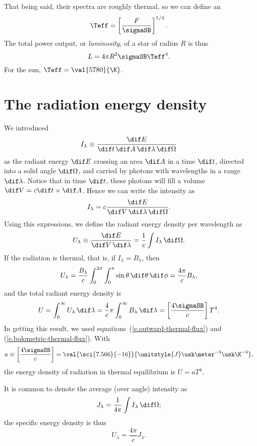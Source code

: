  That being said, their spectra are roughly thermal, so we can define an 
\[	\Teff = \left[\frac{F}{\sigmaSB}\right]^{1/4}. \]
The total power output, or \emph{luminosity}, of a star of radius $R$ is thus
\begin{equation}\label{e.total-luminosity}
	L = 4\pi R^{2}\sigmaSB \Teff^{4}.
\end{equation}
For the sun, $\Teff = \val{5780}{\K}$.

\section{The radiation energy density}\label{s.radiation-energy-density}

We introduced
\[
I_{\lambda} \equiv \frac{\dif E}{\dif t\,\dif A\,\dif\lambda\,\dif\Omega}
\]
as the radiant energy $\dif E$ crossing an area $\dif A$ in a time $\dif t$, directed into a solid angle $\dif\Omega$, and carried by photons with wavelengths in a range $\dif\lambda$. Notice that in time $\dif t$, these photons will fill a volume $\dif V = c\dif t\times \dif A$. Hence we can write the intensity as
\[
I_{\lambda} = c\frac{\dif E}{\dif V\,\dif \lambda\,\dif\Omega}.
\]
Using this expressions, we define the radiant energy density per wavelength as
\begin{equation}
	U_{\lambda} \equiv \frac{\dif E}{\dif V\,\dif\lambda} = \frac{1}{c}\int I_{\lambda}\,\dif \Omega.
\end{equation}
If the radiation is thermal, that is, if $I_{\lambda} = B_{\lambda}$, then
\[
U_{\lambda} = \frac{B_{\lambda}}{c}\int_{0}^{2\pi}\int_{0}^{\pi}\sin\theta\,\dif\theta\,\dif\phi = \frac{4\pi}{c}B_{\lambda},
\]
and the total radiant energy density is
\[
U = \int_{0}^{\infty}U_{\lambda}\,\dif\lambda = \frac{4}{c}\pi\int_{0}^{\infty}B_{\lambda}\,\dif\lambda = \left[\frac{4\sigmaSB}{c}\right] T^{4}.
\]
In getting this result, we used equations~(\ref{e.outward-thermal-flux}) and (\ref{e.bolometric-thermal-flux}). With
\[ 
a \equiv \left[\frac{4\sigmaSB}{c}\right] = \val{\sci{7.566}{-16}}{\unitstyle{J}\usk\meter^{-3}\usk\K^{-4}},
\]
the energy density of radiation in thermal equilibrium is $U = aT^{4}$.

It is common to denote the average (over angle) intensity as
\begin{equation}\label{e.angle-average-intensity}
J_{\lambda} = \frac{1}{4\pi}\int I_{\lambda}\,\dif\Omega;
\end{equation}
the specific energy density is thus
\[ U_{\lambda} = \frac{4\pi}{c}J_{\lambda}. \]

